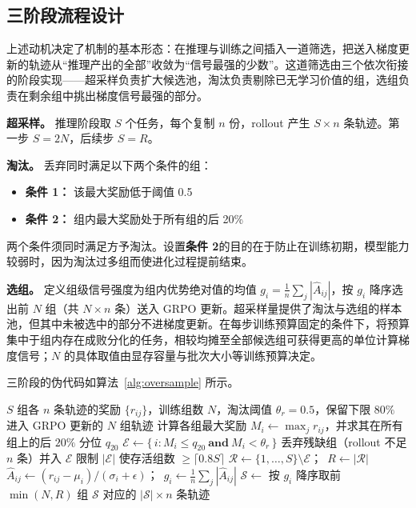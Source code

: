 \subsection{三阶段流程设计}

上述动机决定了机制的基本形态：在推理与训练之间插入一道筛选，把送入梯度更新的轨迹从“推理产出的全部”收敛为“信号最强的少数”。这道筛选由三个依次衔接的阶段实现——超采样负责扩大候选池，淘汰负责剔除已无学习价值的组，选组负责在剩余组中挑出梯度信号最强的部分。

\textbf{超采样。} 推理阶段取 $S$ 个任务，每个复制 $n$ 份，rollout 产生 $S \times n$ 条轨迹。第一步 $S = 2N$，后续步 $S = R$。

\textbf{淘汰。} 丢弃同时满足以下两个条件的组：

\begin{itemize}
    \item \textbf{条件 1：} 该最大奖励低于阈值 0.5
    \item \textbf{条件 2：} 组内最大奖励处于所有组的后 20\%
\end{itemize}

两个条件须同时满足方予淘汰。设置\textbf{条件 2}的目的在于防止在训练初期，模型能力较弱时，因为淘汰过多组而使进化过程提前结束。

\textbf{选组。} 定义组级信号强度为组内优势绝对值的均值 $g_i = \frac{1}{n}\sum_j |\hat{A}_{ij}|$，按 $g_i$ 降序选出前 $N$ 组（共 $N \times n$ 条）送入 GRPO 更新。超采样量提供了淘汰与选组的样本池，但其中未被选中的部分不进梯度更新。在每步训练预算固定的条件下，将预算集中于组内存在成败分化的任务，相较均摊至全部候选组可获得更高的单位计算梯度信号；$N$ 的具体取值由显存容量与批次大小等训练预算决定。

三阶段的伪代码如算法~\ref{alg:oversample} 所示。

\begin{algorithm}[htbp]
\caption{超采样-淘汰-选组}
\label{alg:oversample}
\begin{algorithmic}[1]
\Require $S$ 组各 $n$ 条轨迹的奖励 $\{r_{ij}\}$，训练组数 $N$，淘汰阈值 $\theta_r{=}0.5$，保留下限 $80\%$
\Ensure 进入 GRPO 更新的 $N$ 组轨迹
\State 计算各组最大奖励 $M_i \gets \max_j r_{ij}$，并求其在所有组上的后 $20\%$ 分位 $q_{20}$
\State $\mathcal{E} \gets \{\, i : M_i \le q_{20} \ \textbf{and}\ M_i < \theta_r \,\}$ 
\State 丢弃残缺组（rollout 不足 $n$ 条）并入 $\mathcal{E}$
\State 限制 $|\mathcal{E}|$ 使存活组数 $\ge \lceil 0.8 S \rceil$ 
\State $\mathcal{R} \gets \{1,\dots,S\} \setminus \mathcal{E}$；\ $R \gets |\mathcal{R}|$ 
    \State $\hat{A}_{ij} \gets (r_{ij}-\mu_i)/(\sigma_i+\epsilon)$；\ $g_i \gets \frac{1}{n}\sum_j |\hat{A}_{ij}|$ 
\EndFor
\State $\mathcal{S} \gets$ 按 $g_i$ 降序取前 $\min(N, R)$ 组 
\State \Return $\mathcal{S}$ 对应的 $|\mathcal{S}|\times n$ 条轨迹
\end{algorithmic}
\end{algorithm}

